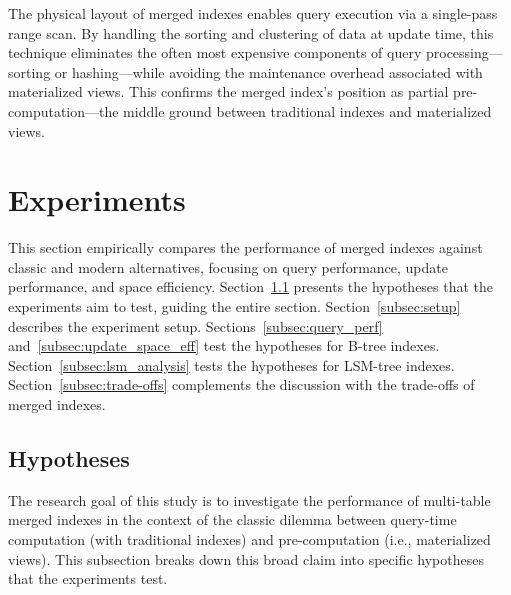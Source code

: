 \documentclass[sigconf, pdfa, nonacm]{acmart}
\begin{document}
The physical layout of merged indexes enables query execution via a single-pass range scan. By handling the sorting and clustering of data at update time, this technique eliminates the often most expensive components of query processing---sorting or hashing---while avoiding the maintenance overhead associated with materialized views. This confirms the merged index's position as partial pre-computation---the middle ground between traditional indexes and materialized views.

\section{Experiments}\label{sec:experiments}

This section empirically compares the performance of merged indexes against classic and modern alternatives, focusing on query performance, update performance, and space efficiency.
Section~\ref{subsec:hypotheses} presents the hypotheses that the experiments aim to test, guiding the entire section. Section~\ref{subsec:setup} describes the experiment setup. Sections~\ref{subsec:query_perf} and~\ref{subsec:update_space_eff} test the hypotheses for B-tree indexes. 
Section~\ref{subsec:lsm_analysis} tests the hypotheses for LSM-tree indexes.
Section~\ref{subsec:trade-offs} complements the discussion with the trade-offs of merged indexes.

\subsection{Hypotheses}\label{subsec:hypotheses}

The research goal of this study is to investigate the performance of multi-table merged indexes in the context of the classic dilemma between query-time computation (with traditional indexes) and pre-computation (i.e., materialized views). This subsection breaks down this broad claim into specific hypotheses that the experiments test.
\end{document}
